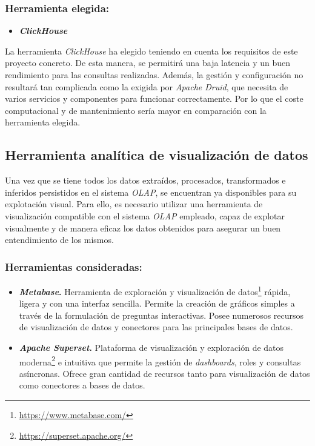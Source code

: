 \subsubsection{Herramienta elegida:}

\begin{itemize}
    \item \textbf{\textit{ClickHouse}}
\end{itemize}

La herramienta \textit{ClickHouse} ha elegido teniendo en cuenta los requisitos de este proyecto concreto. De esta manera, se permitirá una baja latencia y un buen rendimiento para las consultas realizadas. Además, la gestión y configuración no resultará tan complicada como la exigida por \textit{Apache Druid}, que necesita de varios servicios y componentes para funcionar correctamente. Por lo que el coste computacional y de mantenimiento sería mayor en comparación con la herramienta elegida.

\subsection{Herramienta analítica de visualización de datos}

Una vez que se tiene todos los datos extraídos, procesados, transformados e inferidos persistidos en el sistema \textit{OLAP}, se encuentran ya disponibles para su explotación visual. Para ello, es necesario utilizar una herramienta de visualización compatible con el sistema \textit{OLAP} empleado, capaz de explotar visualmente y de manera eficaz los datos obtenidos para asegurar un buen entendimiento de los mismos.

\subsubsection{Herramientas consideradas:}

\begin{itemize}
    \item \textbf{\textit{Metabase}.} Herramienta de exploración y visualización de datos\footnote{\url{https://www.metabase.com/}} rápida, ligera y con una interfaz sencilla. Permite la creación de gráficos simples a través de la formulación de preguntas interactivas. Posee numerosos recursos de visualización de datos y conectores para las principales bases de datos. 
    
    \item \textbf{\textit{Apache Superset}.} Plataforma de visualización y exploración de datos moderna\footnote{\url{https://superset.apache.org/}} e intuitiva que permite la gestión de \textit{dashboards}, roles y consultas asíncronas. Ofrece gran cantidad de recursos tanto para visualización de datos como conectores a bases de datos.
\end{itemize}

